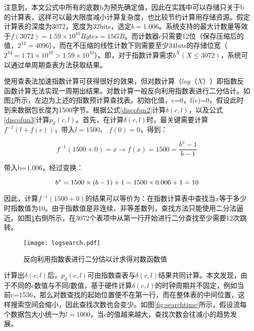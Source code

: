 注意到，本文公式中所有的底数b为预先确定值，因此在实践中可以存储只关于b的计算表，这样可以最大限度减小计算复杂度，也比较节约计算用存储资源。假定计算表的深度为3072，宽度为32bits，选定$ b=1.006 $。系统支持的最大计数量等效于$ f(3072)=1.59\times10^{10}Bytes=15GB $。而计数器$ c $只需要12位（保存压缩后的值，$ 2^{12}=4096 $），而在不压缩的线性计数下则需要至少34bits的存储位宽（$ 2^{34}=1.71\times10^{10}>1.59\times10^{10}$）。即，对于指数计算需求$b^X (X \leq 3072)$，系统可以通过单周期查表方法获取结果。


使用查表法加速指数计算可获得很好的效果，但对数计算（$ log（X） $）即指数反函数计算无法实现一周期出结果。对数计算一般反向利用指数表进行二分估计。如图\ref{fig:logsearch}所示，左边为上述的指数预计算查找表。初始化值，c=0，f(c)=0，假设此时到来数据包长度为1500字节。根据公式\ref{discofun2}计算$ \delta(c,l)$，以及公式\ref{discofun3}计算$p_d(c,l) $。首先，在计算$ \delta(c,l)$时，最关键需要计算 $ f^{-1}(l+f(c)) $，带入$ l=1500 $、 $ f(0)=0 $，得到：

\begin{equation} \label{discofun3}
f^{-1}(1500+0) = x \rightarrow f(x)=1500 = \dfrac{b^x-1}{b-1}
\end{equation}

带入b=1.006，经过变换：

\begin{equation} \label{discofun3}
b^x=1500\times(b-1)+1\\
= 1500\times 0.006+1\\
=10
\end{equation}

因此，计算$ f^{-1}(1500+0) $的结果可以等价为：在指数计算表中查找当$ x $等于多少时指数值为10。由于指数值是非连续、非等差数列，查找方法只能使用二分法逼近。如图\ref{fig:logsearch}右侧所示，在3072个表项中从第一行开始进行二分查找至少需要12次跳转。

\begin{figure}[!ht]
	\centering
	\texttt{[image: logsearch.pdf]}
	\caption{反向利用指数表进行二分估以计求得对数函数值} \label{fig:logsearch}
\end{figure}

计算出$ \delta(c,l)$后，$p_d(c,l) $可由指数查表与$ \delta(c,l)$结果共同计算。本文发现，由于不同的$ c $数值与不同$ l $数值，基于硬件计算$ \delta(c,l)$的时钟周期并不固定，例如当前c=1536，那么对数查找的起始位置便不在第一行，而在整体表的中间位置，这样搜索空间会缩小，因此查找次数也会变少。如图\ref{fig:searchtime}所示，假设流每个数据包大小统一为$ l=1000 $，当c的值越来越大，查找次数会往减小的趋势发展。

